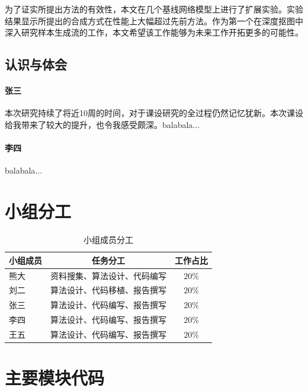 \documentclass[supercite]{HustGraduPaper}
\begin{document}
	为了证实所提出方法的有效性，本文在几个基线网络模型上进行了扩展实验。实验结果显示所提出的合成方式在性能上大幅超过先前方法。作为第一个在深度抠图中深入研究样本生成流的工作，本文希望该工作能够为未来工作开拓更多的可能性。


	\subsection{认识与体会}
	\paragraph{张三} 本次研究持续了将近10周的时间，对于课设研究的全过程仍然记忆犹新。本次课设给我带来了较大的提升，也令我感受颇深。balabala...

    \paragraph{李四} balabala...

	\newpage

    \section*{小组分工}


    \begin{table}[htbp]
		\renewcommand\arraystretch{2.0}
		\setlength{\tabcolsep}{10pt}
		\vspace{10pt}
		\centering
		\caption{小组成员分工}
		\label{tab:styles-A2U}
		\begin{tabular}{@{}lcc@{}}
		\toprule
		小组成员 & 任务分工 & 工作占比 \\
		\midrule
        熊大 & 资料搜集、算法设计、代码编写 & $20\%$\\
        刘二 & 算法设计、代码移植、报告撰写  & $20\%$\\
        张三 & 算法设计、代码编写、报告撰写  & $20\%$\\
        李四 & 算法设计、代码编写、报告撰写  &  $20\%$\\
        王五 & 算法设计、代码编写、报告撰写  &  $20\%$\\
		\bottomrule
		\end{tabular}
	\end{table}

    



\newpage
\section*{主要模块代码}



\end{document}
